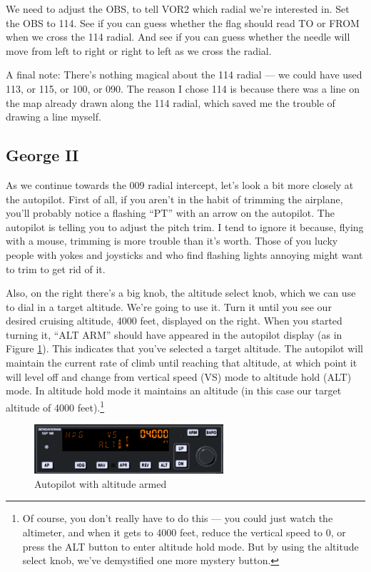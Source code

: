 We need to adjust the OBS, to tell VOR2 which radial we're interested
in.  Set the OBS to 114.  See if you can guess whether the flag should
read TO or FROM when we cross the 114 radial.  And see if you can
guess whether the needle will move from left to right or right to left
as we cross the radial.

A final note: There's nothing magical about the 114 radial --- we
could have used 113, or 115, or 100, or 090.  The reason I chose 114
is because there was a line on the map already drawn along the 114
radial, which saved me the trouble of drawing a line myself.

\subsection{George II}

As we continue towards the 009 radial intercept, let's look a bit more
closely at the autopilot.  First of all, if you aren't in the habit of
trimming the airplane, you'll probably notice a flashing ``PT'' with
an arrow on the autopilot.  The autopilot is telling you to adjust the
pitch trim.  I tend to ignore it because, flying with a mouse,
trimming is more trouble than it's worth.  Those of you lucky people
with yokes and joysticks and who find flashing lights annoying might
want to trim to get rid of it.

Also, on the right there's a big knob, the altitude select knob, which
we can use to dial in a target altitude.  We're going to use it.  Turn
it until you see our desired cruising altitude, 4000 feet, displayed
on the right.  When you started turning it, ``ALT ARM'' should have
appeared in the autopilot display (as in Figure \ref{fig:ap_alt}).
This indicates that you've selected a target altitude.  The autopilot
will maintain the current rate of climb until reaching that altitude,
at which point it will level off and change from vertical speed (VS)
mode to altitude hold (ALT) mode.  In altitude hold mode it maintains
an altitude (in this case our target altitude of 4000 feet).\footnote{
  Of course, you don't really have to do this --- you could just watch
  the altimeter, and when it gets to 4000 feet, reduce the vertical
  speed to 0, or press the ALT button to enter altitude hold mode.
  But by using the altitude select knob, we've demystified one more
  mystery button.}

\begin{figure}
  \begin{center}
    \includegraphics[width=7cm]{img/ap_alt.png}
    \caption{Autopilot with altitude armed}
    \label{fig:ap_alt}
  \end{center}
\end{figure}

